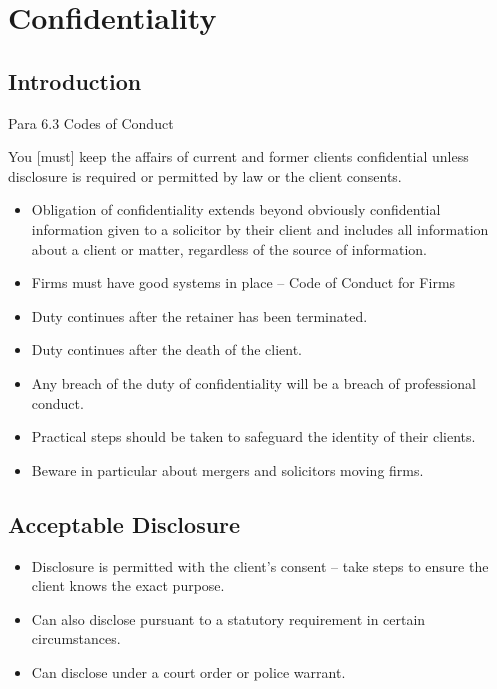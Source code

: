 \documentclass[
]{article}
\providecommand{\tightlist}{%
  \setlength{\itemsep}{0pt}\setlength{\parskip}{0pt}}
\newenvironment{env-28b706cc-8a08-422f-af86-ede86c79505b}
{
    \savenotes\tcolorbox[blanker,breakable,left=5pt,borderline west={2pt}{-4pt}{green}]
}
{
    \endtcolorbox\spewnotes
}
\begin{document}
\hypertarget{confidentiality}{%
\section{Confidentiality}\label{confidentiality}}

\hypertarget{introduction-1}{%
\subsection{Introduction}\label{introduction-1}}

\begin{env-28b706cc-8a08-422f-af86-ede86c79505b}

Para 6.3 Codes of Conduct

You {[}must{]} keep the affairs of current and former clients
confidential unless disclosure is required or permitted by law or the
client consents.

\end{env-28b706cc-8a08-422f-af86-ede86c79505b}

\begin{itemize}
\tightlist
\item
  Obligation of confidentiality extends beyond obviously confidential
  information given to a solicitor by their client and includes all
  information about a client or matter, regardless of the source of
  information.
\item
  Firms must have good systems in place -- Code of Conduct for Firms
\item
  Duty continues after the retainer has been terminated.
\item
  Duty continues after the death of the client.
\item
  Any breach of the duty of confidentiality will be a breach of
  professional conduct.
\item
  Practical steps should be taken to safeguard the identity of their
  clients.
\item
  Beware in particular about mergers and solicitors moving firms.
\end{itemize}

\hypertarget{acceptable-disclosure}{%
\subsection{Acceptable Disclosure}\label{acceptable-disclosure}}

\begin{itemize}
\tightlist
\item
  Disclosure is permitted with the client's consent -- take steps to
  ensure the client knows the exact purpose.
\item
  Can also disclose pursuant to a statutory requirement in certain
  circumstances.
\item
  Can disclose under a court order or police warrant.
\end{itemize}
\end{document}
